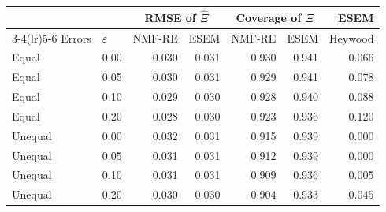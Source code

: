 \begin{tabular}{llrrrrr}
\toprule
& & \multicolumn{2}{c}{RMSE of $\widehat\Xi$} & \multicolumn{2}{c}{Coverage of $\Xi$} & ESEM \\
\cmidrule(lr){3-4}\cmidrule(lr){5-6}
Errors & $\varepsilon$ & NMF-RE & ESEM & NMF-RE & ESEM & Heywood \\
\midrule
Equal & 0.00 & 0.030 & 0.031 & 0.930 & 0.941 & 0.066 \\
Equal & 0.05 & 0.030 & 0.031 & 0.929 & 0.941 & 0.078 \\
Equal & 0.10 & 0.029 & 0.030 & 0.928 & 0.940 & 0.088 \\
Equal & 0.20 & 0.028 & 0.030 & 0.923 & 0.936 & 0.120 \\
\midrule
Unequal & 0.00 & 0.032 & 0.031 & 0.915 & 0.939 & 0.000 \\
Unequal & 0.05 & 0.031 & 0.031 & 0.912 & 0.939 & 0.000 \\
Unequal & 0.10 & 0.031 & 0.031 & 0.909 & 0.936 & 0.005 \\
Unequal & 0.20 & 0.030 & 0.030 & 0.904 & 0.933 & 0.045 \\
\bottomrule
\end{tabular}
